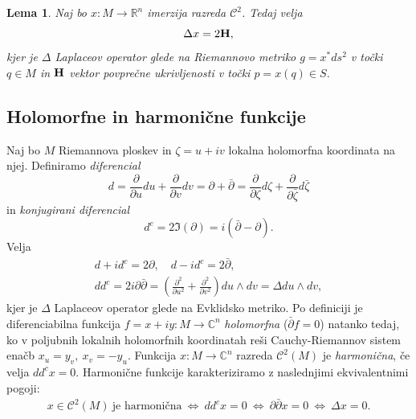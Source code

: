 \documentclass[12pt,a4paper,twoside]{article}
\theoremstyle{definition} %
\theoremstyle{plain} %
\newtheorem{lema}[definicija]{Lema}
\numberwithin{equation}{section}  %
\newcommand{\R}{\mathbb R}
\begin{document}
\begin{lema} \label{lema:laplace=2H}
Naj bo $x \colon M \to \R^{n}$ imerzija razreda $\mathcal{C}^2$. Tedaj velja
\begin{equation}
\Delta{x} = 2 \textbf{\textup{H}},
\end{equation}
kjer je $\Delta$ Laplaceov operator glede na Riemannovo metriko $g = x^{*}ds^2$ v točki $q \in M$ in $\textbf{\textup{H}}$ vektor povprečne ukrivljenosti v točki $p = x(q) \in S$.
\end{lema}

\subsection{Holomorfne in harmonične funkcije}
%
Naj bo $M$ Riemannova ploskev in $\zeta = u+iv$ lokalna holomorfna koordinata na njej. 
Definiramo \emph{diferencial} 
\begin{equation}
d = \frac{\partial}{\partial u}du + \frac{\partial}{\partial v}dv = \partial + \bar{\partial} = \frac{\partial}{\partial \zeta}d\zeta + \frac{\partial}{\partial \bar{\zeta}}d\bar{\zeta}
\end{equation}
in \emph{konjugirani diferencial}
\begin{equation}
d^{c} = 2 \Im(\partial) = i(\bar{\partial} - \partial).
\end{equation}
Velja
\begin{gather*}
d + id^{c} = 2\partial , \quad  d - id^{c} = 2\bar{\partial}, \\
dd^{c} = 2i\partial \bar{\partial} = \left( \frac{\partial^2}{\partial u^2} + \frac{\partial^2}{\partial v^2} \right) du \wedge dv = \Delta du \wedge dv,
\end{gather*}
kjer je $\Delta$ Laplaceov operator glede na Evklidsko metriko.\newline
Po definiciji je diferenciabilna funkcija $f = x + iy \colon M \to \mathbb{C}^{n}$ \emph{holomorfna} ($\bar{\partial}f = 0$) natanko tedaj, ko v poljubnih lokalnih holomorfnih koordinatah reši Cauchy-Riemannov sistem enačb $x_{u}=y_{v}, \ x_{v}=-y_{u}$.\newline
Funkcija $x \colon M \to \mathbb{C}^{n}$ razreda $\mathcal{C}^2(M)$ je \emph{harmonična}, če velja $dd^{c}x=0$.
Harmonične funkcije karakteriziramo z naslednjimi ekvivalentnimi pogoji:
\begin{gather*}
x \in \mathcal{C}^2(M) \ \text{je harmonična} \ \iff \ dd^{c}x=0 \ \iff \ \partial \bar{\partial}x=0 \ \iff \ \Delta x=0.
\end{gather*}
\end{document}
